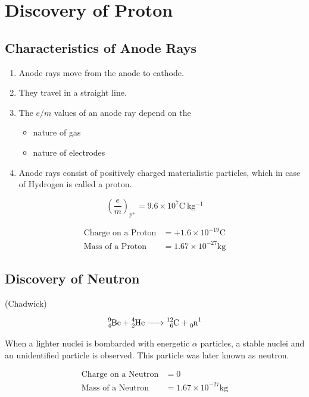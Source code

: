 \documentclass[12pt,a4paper]{article}
\begin{document}
\section*{Discovery of Proton}


\subsection*{Characteristics of Anode Rays}

\begin{enumerate}
  \item Anode rays move from the anode to cathode.
  \item They travel in a straight line.
  \item The $e/m$ values of an anode ray depend on the
        \begin{itemize}
          \item nature of gas
          \item nature of electrodes
        \end{itemize}
  \item Anode rays consist of positively charged materialistic particles, which in case of Hydrogen is called a proton.
\end{enumerate}

$$\left(\frac em\right)_{p^+}=9.6\times 10^{7} \mathrm{C\ kg^{-1}}$$

\begin{align*}
  \text{Charge on a Proton} & = +1.6\times 10^{-19} \mathrm{C}  \\
  \text{Mass of a Proton}   & = 1.67\times 10^{-27} \mathrm{kg}
\end{align*}


\subsection*{Discovery of Neutron}
(Chadwick)

$$\ce{_4^9Be + _2^4He -> _6^12C + _0n^1}$$

When a lighter nuclei is bombarded with energetic $\alpha$ particles, a stable nuclei and an unidentified particle is observed. This particle was later known as neutron.


\begin{align*}
  \text{Charge on a Neutron} & = 0                               \\
  \text{Mass of a Neutron}   & = 1.67\times 10^{-27} \mathrm{kg}
\end{align*}
\end{document}
